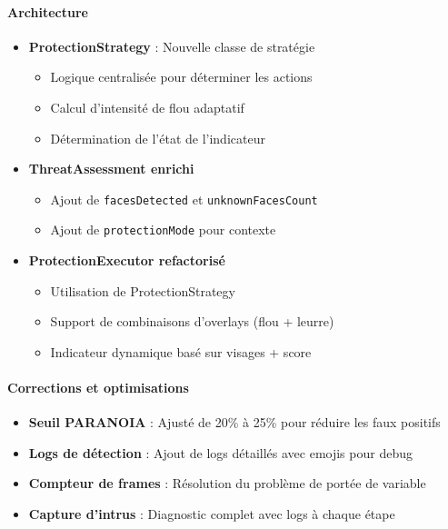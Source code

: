 \documentclass[11pt,a4paper]{article}
\begin{document}
\paragraph{Architecture}
\begin{itemize}
    \item \textbf{ProtectionStrategy} : Nouvelle classe de stratégie
    \begin{itemize}
        \item Logique centralisée pour déterminer les actions
        \item Calcul d'intensité de flou adaptatif
        \item Détermination de l'état de l'indicateur
    \end{itemize}
    \item \textbf{ThreatAssessment enrichi}
    \begin{itemize}
        \item Ajout de \texttt{facesDetected} et \texttt{unknownFacesCount}
        \item Ajout de \texttt{protectionMode} pour contexte
    \end{itemize}
    \item \textbf{ProtectionExecutor refactorisé}
    \begin{itemize}
        \item Utilisation de ProtectionStrategy
        \item Support de combinaisons d'overlays (flou + leurre)
        \item Indicateur dynamique basé sur visages + score
    \end{itemize}
\end{itemize}

\paragraph{Corrections et optimisations}
\begin{itemize}
    \item \textbf{Seuil PARANOIA} : Ajusté de 20\% à 25\% pour réduire les faux positifs
    \item \textbf{Logs de détection} : Ajout de logs détaillés avec emojis pour debug
    \item \textbf{Compteur de frames} : Résolution du problème de portée de variable
    \item \textbf{Capture d'intrus} : Diagnostic complet avec logs à chaque étape
\end{itemize}
\end{document}
